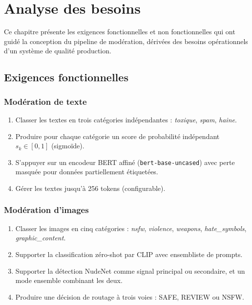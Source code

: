\chapter{Analyse des besoins}
\label{ch:requirements}

Ce chapitre présente les exigences fonctionnelles et non fonctionnelles qui ont guidé la conception du pipeline de modération, dérivées des besoins opérationnels d'un système de qualité production.

\section{Exigences fonctionnelles}

\subsection{Modération de texte}
\begin{enumerate}[nosep, label=FR-T\arabic*]
  \item Classer les textes en trois catégories indépendantes : \emph{toxique}, \emph{spam}, \emph{haine}.
  \item Produire pour chaque catégorie un score de probabilité indépendant $s_k \in [0, 1]$ (sigmoïde).
  \item S'appuyer sur un encodeur BERT affiné (\texttt{bert-base-uncased}) avec perte masquée pour données partiellement étiquetées.
  \item Gérer les textes jusqu'à 256 tokens (configurable).
\end{enumerate}

\subsection{Modération d'images}
\begin{enumerate}[nosep, label=FR-I\arabic*]
  \item Classer les images en cinq catégories : \emph{nsfw}, \emph{violence}, \emph{weapons}, \emph{hate\_symbols}, \emph{graphic\_content}.
  \item Supporter la classification zéro-shot par CLIP avec ensembliste de prompts.
  \item Supporter la détection NudeNet comme signal principal ou secondaire, et un mode ensemble combinant les deux.
  \item Produire une décision de routage à trois voies : SAFE, REVIEW ou NSFW.
\end{enumerate}

